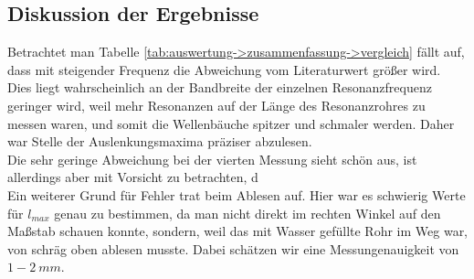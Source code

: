 \subsection{Diskussion der Ergebnisse}
\label{sub:auswertung->Diskussion}
Betrachtet man Tabelle \ref{tab:auswertung->zusammenfassung->vergleich} fällt auf, dass mit steigender Frequenz die Abweichung vom Literaturwert größer wird. Dies liegt wahrscheinlich an der Bandbreite der einzelnen Resonanzfrequenz geringer wird, weil mehr Resonanzen auf der Länge des Resonanzrohres zu messen waren, und somit die Wellenbäuche spitzer und schmaler werden. Daher war Stelle der Auslenkungsmaxima präziser abzulesen. \\
Die sehr geringe Abweichung bei der vierten Messung sieht schön aus, ist allerdings aber mit Vorsicht zu betrachten, d \\
Ein weiterer Grund für Fehler trat beim Ablesen auf. Hier war es schwierig Werte für $l_{max}$ genau zu bestimmen, da man nicht direkt im rechten Winkel auf den Maßstab schauen konnte, sondern, weil das mit Wasser gefüllte Rohr im Weg war, von schräg oben ablesen musste. Dabei schätzen wir eine Messungenauigkeit von $1-2~mm$. 
